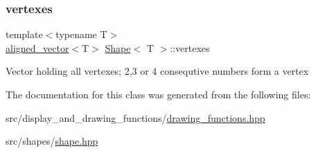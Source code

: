 \mbox{\label{classShape_a50296217cf654fc7b756b67a2f0305c2}} 
\subsubsection{\texorpdfstring{vertexes}{vertexes}}
{\footnotesize\ttfamily template$<$typename T$>$ \\
\mbox{\hyperlink{type__definitions_8hpp_a087efd587d66b881646ef378f1919c90}{aligned\+\_\+vector}}$<$T$>$ \mbox{\hyperlink{classShape}{Shape}}$<$ T $>$\+::vertexes\hspace{0.3cm}{\ttfamily [protected]}}

Vector holding all vertexes; 2,3 or 4 consequtive numbers form a vertex 

The documentation for this class was generated from the following files\+:\begin{DoxyCompactItemize}
\item 
src/display\+\_\+and\+\_\+drawing\+\_\+functions/\mbox{\hyperlink{drawing__functions_8hpp}{drawing\+\_\+functions.\+hpp}}\item 
src/shapes/\mbox{\hyperlink{shape_8hpp}{shape.\+hpp}}\end{DoxyCompactItemize}
